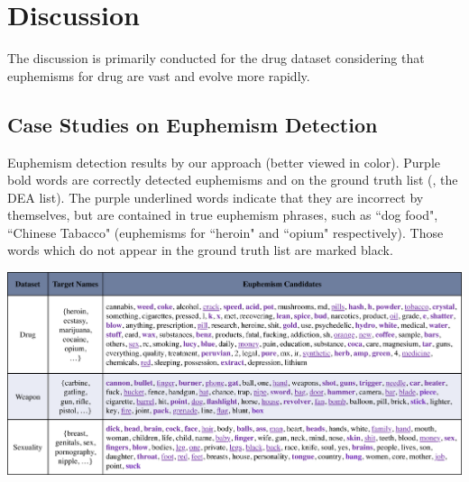 \section{Discussion}
\label{sec:dis}
The discussion is primarily conducted for the drug dataset considering that euphemisms for drug are vast and evolve more rapidly. 


\subsection{Case Studies on Euphemism Detection}

\begin{table}
	\centering
	\caption{Euphemism detection results by our approach (better viewed in color). 
		Purple bold words are correctly detected euphemisms and on the ground truth list (\ie, the DEA list). 
		The purple underlined words indicate that they are incorrect by themselves, but are contained in true euphemism phrases, such as ``dog food", ``Chinese Tabacco" (euphemisms for ``heroin" and ``opium" respectively). 
		Those words which do not appear in the ground truth list are marked black. 
		}
	\includegraphics[width=1\linewidth]{figures/CaseStudies-Detection}
	\label{fig:casestudies-detection}
\end{table}

